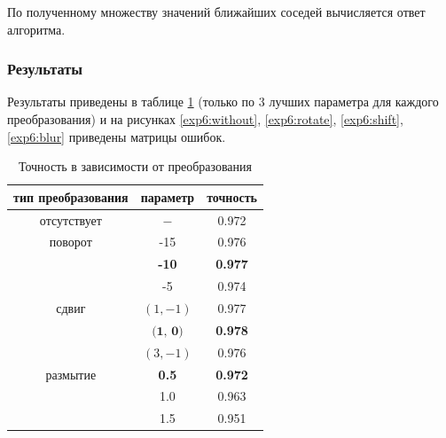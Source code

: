 \documentclass[a4paper, 11pt]{article}
\begin{document}
    По полученному множеству значений ближайших соседей вычисляется ответ алгоритма.
    \subsubsection{Результаты}
     Результаты приведены в таблице \ref{exp6:table} (только по 3 лучших параметра для каждого преобразования) и на рисунках \ref{exp6:without}, \ref{exp6:rotate},
    \ref{exp6:shift}, \ref{exp6:blur} приведены матрицы ошибок.
    \begin{table}[h]
        \caption{Точность в зависимости от преобразования} \label{exp6:table}
        \begin{center}
            \begin{tabular}{|c|c|c|}
                \hline 
                тип преобразования & параметр & точность \\ 
                \hline
                отсутствует & $-$ & 0.972 \\ 
                \hline
                поворот & -15 & 0.976 \\ 
                \cline{2-3}
                & \textbf{-10} & \textbf{0.977} \\ 
                \cline{2-3}
                & -5 & 0.974 \\ 
                \hline 
                сдвиг & $(1, -1)$ & 0.977 \\ 
                \cline{2-3}
                & $\textbf{(1, 0)}$ & \textbf{0.978} \\ 
                \cline{2-3}
                & $(3, -1)$ & 0.976 \\ 
                \hline 
                размытие & \textbf{0.5} & \textbf{0.972} \\ 
                \cline{2-3}
                & 1.0 & 0.963 \\ 
                \cline{2-3}
                & 1.5 & 0.951 \\ 
                \hline 
            \end{tabular}
        \end{center}
    \end{table}
\end{document}
